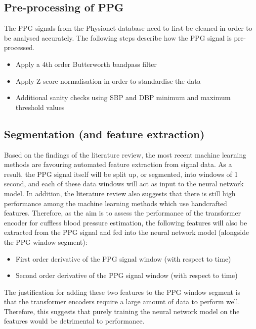\subsection{Pre-processing of PPG}
The PPG signals from the Physionet database need to first be cleaned in order to be analysed accurately. The following steps describe how the PPG signal is pre-processed.
\begin{itemize}
    \item Apply a 4th order Butterworth bandpass filter
    \item Apply Z-score normalisation in order to standardise the data
    \item Additional sanity checks using SBP and DBP minimum and maximum threshold values
\end{itemize}

\subsection{Segmentation (and feature extraction)}
Based on the findings of the literature review, the most recent machine learning methods are favouring automated feature extraction from signal 
data. As a result, the PPG signal itself will be split up, or segmented, into windows of 1 second, and each of these data windows will 
act as input to the neural network model. In addition, the literature review also suggests that there is still high performance among the machine 
learning methods which use handcrafted features. Therefore, as the aim is to assess the performance of the transformer encoder for cuffless blood 
pressure estimation, the following features will also be extracted from the PPG signal and fed into the neural network model (alongside the PPG window segment):

\begin{itemize}
    \item First order derivative of the PPG signal window (with respect to time)
    \item Second order derivative of the PPG signal window (with respect to time)
\end{itemize}\noindent The justification for adding these two features to the PPG window segment is that the transformer encoders 
require a large amount of data to perform well. Therefore, this suggests that purely training the neural network model on the features would be 
detrimental to performance.

